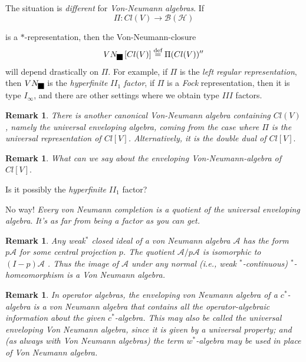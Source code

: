 \documentclass[aps,preprint]{revtex4}%
\providecommand{\U}[1]{\protect\rule{.1in}{.1in}}
\newtheorem{remark}[theorem]{Remark}
\begin{document}
The situation is \emph{different} for \emph{Von-Neumann algebras}. If%
\begin{equation}
\Pi:Cl(V)\rightarrow\mathcal{B}(\mathcal{H})
\end{equation}


is a $\ast$-representation, then the Von-Neumann-closure
\begin{equation}
VN_{\U{3c0} }\left[  Cl(V)\right]  \overset{\text{def}}{=}\Pi(Cl(V))^{\prime
\prime}%
\end{equation}
will depend drastically on $\Pi$. For example, if $\Pi$ is the \emph{left
regular representation}, then $VN_{\U{3c0} }$ is the \emph{hyperfinite}
$II_{1}$ \emph{factor}, if $\Pi$ is a \emph{Fock} representation, then it is
type $I_{\infty}$, and there are other settings where we obtain type $III$ factors.

\begin{remark}
There is another canonical Von-Neumann algebra containing $Cl(V)$, namely the
\emph{universal enveloping} \emph{algebra}, coming from the case where $\Pi$
is the \emph{universal representation} of $Cl[V]$. Alternatively, it is the
double dual of $Cl[V].$
\end{remark}

\begin{remark}
What can we say about the enveloping Von-Neumann-algebra of $Cl[V].$
\end{remark}

Is it possibly the \emph{hyperfinite} $II_{1}$ factor?

No way! \emph{Every von Neumann completion is a quotient of the universal
enveloping algebra}. \emph{It's as far from being a factor as you can get.}

\begin{remark}
Any \emph{weak}$^{\ast}$ closed ideal of a von Neumann algebra $\mathcal{A}$
has the form $p\mathcal{A}$ for some central projection $p$. The quotient
$\mathcal{A}/p\mathcal{A}$ is isomorphic to $(I-p)\mathcal{A}$ . Thus the
image of $\mathcal{A}$ under any normal (i.e., \emph{weak }$^{\ast}%
$-continuous) $^{\ast}$-homeomorphism is a Von Neumann algebra.
\end{remark}

\begin{remark}
In operator algebras, the \emph{enveloping von Neumann algebra} of a $c^{\ast
}$-algebra is a von Neumann algebra that contains all the operator-algebraic
information about the given $c^{\ast}$-algebra. This may also be called the
\emph{universal enveloping Von Neumann algebra}, since it is given by a
universal property; and (as always with Von Neumann algebras) the term
$w^{\ast}$-algebra may be used in place of Von Neumann algebra.
\end{remark}
\end{document}
